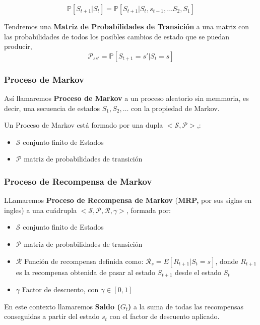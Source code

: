 \documentclass[
  a4paper,
  DIV=11,
  numbers=noendperiod]{scrreprt}
\providecommand{\tightlist}{%
  \setlength{\itemsep}{0pt}\setlength{\parskip}{0pt}}\usepackage{longtable,booktabs,array}
\begin{document}
\[
\mathbb P[S_{t+1}| S_t] = \mathbb P[ S_{t+1}| S_t, s_{t-1}, ... S_2, S_1]
\]

Tendremos una \textbf{Matriz de Probabilidades de Transición} a una
matriz con las probabilidades de todos los posibles cambios de estado
que se puedan producir,
\[\mathcal P_{ss'}=\mathbb P[S_{t+1}=s'|S_t = s]\]

\hypertarget{proceso-de-markov}{%
\subsubsection{Proceso de Markov}\label{proceso-de-markov}}

Así llamaremos \textbf{Proceso de Markov} a un proceso aleatorio sin
memmoria, es decir, una secuencia de estados \(S_1, S_2, …\) con la
propiedad de Markov.

Un Proceso de Markov está formado por una dupla
\(<\mathcal S,\mathcal P>\),:

\begin{itemize}
\tightlist
\item
  \(\mathcal S\) conjunto finito de Estados
\item
  \(\mathcal P\) matriz de probabilidades de transición
\end{itemize}

\hypertarget{proceso-de-recompensa-de-markov}{%
\subsubsection{Proceso de Recompensa de
Markov}\label{proceso-de-recompensa-de-markov}}

LLamaremos \textbf{Proceso de Recompensa de Markov} (\textbf{MRP,} por
sus siglas en ingles) a una cuádrupla
\(<\mathcal S,\mathcal P,\mathcal R,\gamma>\), formada por:

\begin{itemize}
\tightlist
\item
  \(\mathcal S\) conjunto finito de Estados
\item
  \(\mathcal P\) matriz de probabilidades de transición
\item
  \(\mathcal R\) Función de recompensa definida como:
  \(\mathcal R_s=E[R_{t+1}|S_t=s]\), donde \(R_{t+1}\)es la recompensa
  obtenida de pasar al estado \(S_{t+1}\) desde el estado \(S_t\)
\item
  \(\gamma\) Factor de descuento, con \(\gamma \in [0,1]\)
\end{itemize}

En este contexto llamaremos \textbf{Saldo (}\(G_t\)\textbf{)} a la suma
de todas las recompensas conseguidas a partir del estado \(s_t\) con el
factor de descuento aplicado.
\end{document}
